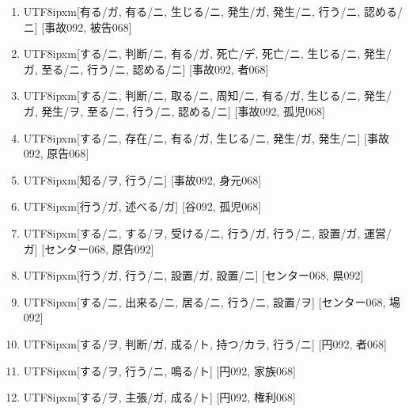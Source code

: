 \begin{enumerate}
\item \begin{CJK}{UTF8}{ipxm}[有る/ガ, 有る/ニ, 生じる/ニ, 発生/ガ, 発生/ニ, 行う/ニ, 認める/ニ] [事故092, 被告068]\end{CJK}
\item \begin{CJK}{UTF8}{ipxm}[する/ニ, 判断/ニ, 有る/ガ, 死亡/デ, 死亡/ニ, 生じる/ニ, 発生/ガ, 至る/ニ, 行う/ニ, 認める/ニ] [事故092, 者068]\end{CJK}
\item \begin{CJK}{UTF8}{ipxm}[する/ニ, 判断/ニ, 取る/ニ, 周知/ニ, 有る/ガ, 生じる/ニ, 発生/ガ, 発生/ヲ, 至る/ニ, 行う/ニ, 認める/ニ] [事故092, 孤児068]\end{CJK}
\item \begin{CJK}{UTF8}{ipxm}[する/ニ, 存在/ニ, 有る/ガ, 生じる/ニ, 発生/ガ, 発生/ニ] [事故092, 原告068]\end{CJK}
\item \begin{CJK}{UTF8}{ipxm}[知る/ヲ, 行う/ニ] [事故092, 身元068]\end{CJK}
\item \begin{CJK}{UTF8}{ipxm}[行う/ガ, 述べる/ガ] [谷092, 孤児068]\end{CJK}
\item \begin{CJK}{UTF8}{ipxm}[する/ニ, する/ヲ, 受ける/ニ, 行う/ガ, 行う/ニ, 設置/ガ, 運営/ガ] [センター068, 原告092]\end{CJK}
\item \begin{CJK}{UTF8}{ipxm}[行う/ガ, 行う/ニ, 設置/ガ, 設置/ニ] [センター068, 県092]\end{CJK}
\item \begin{CJK}{UTF8}{ipxm}[する/ニ, 出来る/ニ, 居る/ニ, 行う/ニ, 設置/ヲ] [センター068, 場092]\end{CJK}
\item \begin{CJK}{UTF8}{ipxm}[する/ヲ, 判断/ガ, 成る/ト, 持つ/カラ, 行う/ニ] [円092, 者068]\end{CJK}
\item \begin{CJK}{UTF8}{ipxm}[する/ヲ, 行う/ニ, 鳴る/ト] [円092, 家族068]\end{CJK}
\item \begin{CJK}{UTF8}{ipxm}[する/ヲ, 主張/ガ, 成る/ト] [円092, 権利068]\end{CJK}

\end{enumerate}
